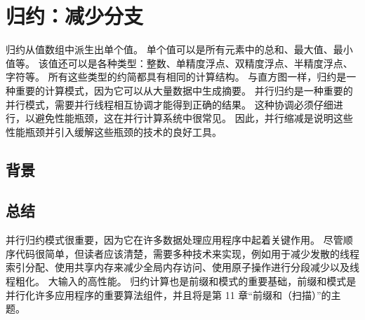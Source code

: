 \section{归约：减少分支}
归约从值数组中派生出单个值。 单个值可以是所有元素中的总和、最大值、最小值等。 该值还可以是各种类型：整数、单精度浮点、双精度浮点、半精度浮点、字符等。 所有这些类型的约简都具有相同的计算结构。 与直方图一样，归约是一种重要的计算模式，因为它可以从大量数据中生成摘要。 并行归约是一种重要的并行模式，需要并行线程相互协调才能得到正确的结果。 这种协调必须仔细进行，以避免性能瓶颈，这在并行计算系统中很常见。 因此，并行缩减是说明这些性能瓶颈并引入缓解这些瓶颈的技术的良好工具。

\subsection{背景}

\subsection{总结}
并行归约模式很重要，因为它在许多数据处理应用程序中起着关键作用。 尽管顺序代码很简单，但读者应该清楚，需要多种技术来实现，例如用于减少发散的线程索引分配、使用共享内存来减少全局内存访问、使用原子操作进行分段减少以及线程粗化。 大输入的高性能。 归约计算也是前缀和模式的重要基础，前缀和模式是并行化许多应用程序的重要算法组件，并且将是第 11 章“前缀和（扫描）”的主题。